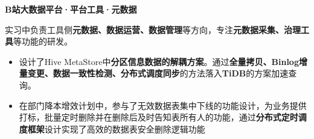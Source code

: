 \documentclass{resume}
\begin{document}
  \textbf{B站大数据平台·平台工具·元数据}
\begin{spacing}{1.2} 
  实习中负责工具侧\textbf{元数据、数据运营、数据管理}等方向，专注\textbf{元数据采集、治理工具}等功能的研发。

  \begin{itemize}
    \item 设计了Hive MetaStore中\textbf{分区信息数据的解耦方案}。通过\textbf{全量拷贝、Binlog增量变更、数据一致性检测、分布式调度同步}的方法落入\textbf{TiDB}的方案加速查询。
    \item 在部门降本增效计划中，参与了无效数据表集中下线的功能设计，为业务提供打标，批量定时删除并在删除后及时告知表所有人的功能，通过\textbf{分布式定时调度框架}设计实现了高效的数据表安全删除逻辑功能
  \end{itemize}
  \end{spacing} 

    

\end{document}
